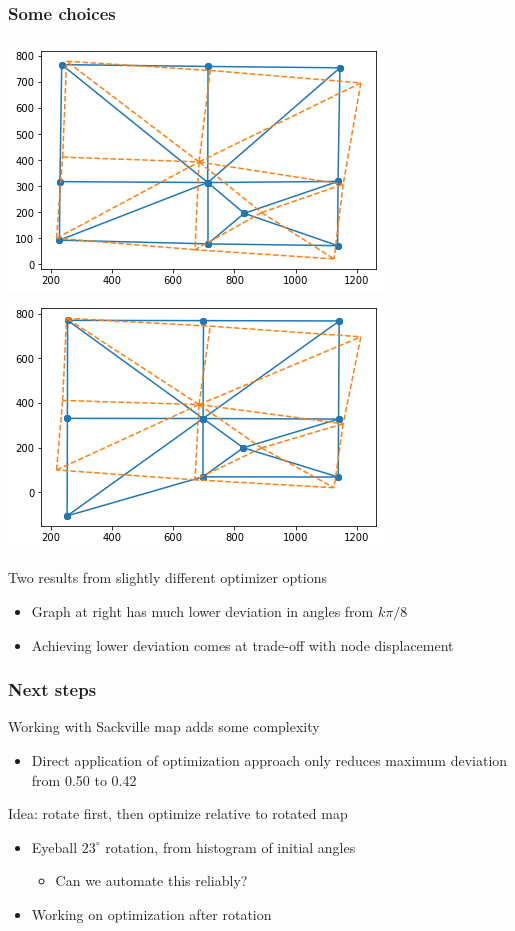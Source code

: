 \documentclass[12pt,t,xcolor=dvipsnames]{beamer}
\begin{document}
\begin{frame}
  \frametitle{Some choices}

  \begin{center}
    \includegraphics[width=0.48\linewidth]{../pngs/closer_terms}
    \hspace*{0.01\linewidth}
    \includegraphics[width=0.48\linewidth]{../pngs/stuckout_term2}
  \end{center}
    
  Two results from slightly different optimizer options
  \begin{itemize}
    \item Graph at right has much lower deviation in angles from
      $k\pi/8$
    \item Achieving lower deviation comes at trade-off with node displacement
  \end{itemize}
\end{frame}

\begin{frame}
  \frametitle{Next steps}

  Working with Sackville map adds some complexity
  \begin{itemize}
  \item Direct application of optimization approach only reduces maximum
    deviation from 0.50 to 0.42
  \end{itemize}

  Idea: rotate first, then optimize relative to rotated map
  \begin{itemize}
  \item Eyeball $23^\circ$ rotation, from histogram of initial angles
    \begin{itemize}
    \item Can we automate this reliably?
    \end{itemize}
  \item Working on optimization after rotation
  \end{itemize}

\end{frame}
\end{document}
